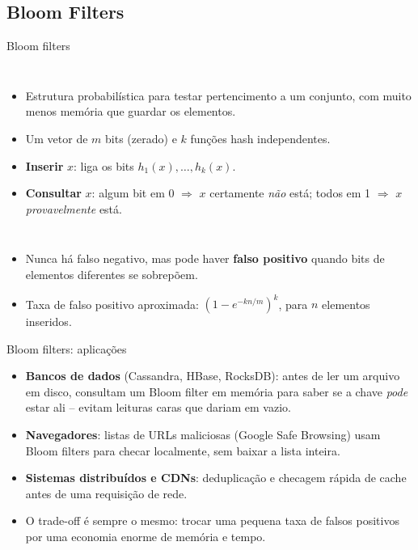 \documentclass{beamer}
\begin{document}
\subsection{Bloom Filters}
\begin{frame}{Bloom filters}
  \small
  \begin{columns}[T]
    \begin{itemize}
      \item Estrutura probabilística para testar pertencimento a um conjunto, com muito menos memória que guardar os elementos.
      \item Um vetor de $m$ bits (zerado) e $k$ funções hash independentes.
      \item \textbf{Inserir} $x$: liga os bits $h_1(x),\ldots,h_k(x)$.
      \item \textbf{Consultar} $x$: algum bit em 0 $\Rightarrow$ $x$ certamente \emph{não} está; todos em 1 $\Rightarrow$ $x$ \emph{provavelmente} está.
    \end{itemize}
    \centering\scriptsize
  \end{columns}
  \medskip
  \begin{itemize}
    \item Nunca há falso negativo, mas pode haver \textbf{falso positivo} quando bits de elementos diferentes se sobrepõem.
    \item Taxa de falso positivo aproximada: $\left(1-e^{-kn/m}\right)^{k}$, para $n$ elementos inseridos.
  \end{itemize}
\end{frame}

\begin{frame}{Bloom filters: aplicações}
  \begin{itemize}
    \item \textbf{Bancos de dados} (Cassandra, HBase, RocksDB): antes de ler um arquivo em disco, consultam um Bloom filter em memória para saber se a chave \emph{pode} estar ali -- evitam leituras caras que dariam em vazio.
    \item \textbf{Navegadores}: listas de URLs maliciosas (Google Safe Browsing) usam Bloom filters para checar localmente, sem baixar a lista inteira.
    \item \textbf{Sistemas distribuídos e CDNs}: deduplicação e checagem rápida de cache antes de uma requisição de rede.
    \item O trade-off é sempre o mesmo: trocar uma pequena taxa de falsos positivos por uma economia enorme de memória e tempo.
  \end{itemize}
\end{frame}
\end{document}
